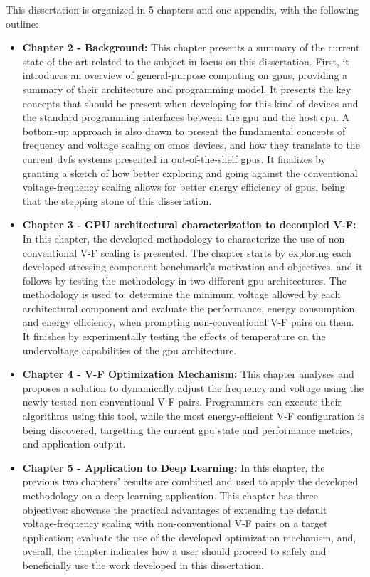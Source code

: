 This dissertation is organized in 5 chapters and one appendix, with the following outline:
\begin{itemize}
    \item \textbf{Chapter 2 - Background:} This chapter presents a summary of the current state-of-the-art related to the subject in focus on this dissertation. First, it introduces an overview of general-purpose computing on \acrshort{gpu}s, providing a summary of their architecture and programming model. It presents the key concepts that should be present when developing for this kind of devices and the standard programming interfaces between the \acrshort{gpu} and the host  \acrshort{cpu}. A bottom-up approach is also drawn to present the fundamental concepts of frequency and voltage scaling on \acrshort{cmos} devices, and how they translate to the current \acrshort{dvfs} systems presented in out-of-the-shelf \acrshort{gpu}s. It finalizes by granting a sketch of how better exploring and going against the conventional voltage-frequency scaling allows for better energy efficiency of \acrshort{gpu}s, being that the stepping stone of this dissertation. 
    \item \textbf{Chapter 3 - GPU architectural characterization to decoupled V-F:} In this chapter, the developed methodology to characterize the use of non-conventional V-F scaling is presented. The chapter starts by exploring each developed stressing component benchmark's motivation and objectives, and it follows by testing the methodology in two different \acrshort{gpu} architectures. The methodology is used to: determine the minimum voltage allowed by each architectural component and evaluate the performance, energy consumption and energy efficiency, when prompting non-conventional V-F pairs on them. It finishes by experimentally testing the effects of temperature on the undervoltage capabilities of the \acrshort{gpu} architecture.
    \item \textbf{Chapter 4 - V-F Optimization Mechanism:} This chapter analyses and proposes a solution to dynamically adjust the frequency and voltage using the newly tested non-conventional V-F pairs. Programmers can execute their algorithms using this tool, while the most energy-efficient V-F configuration is being discovered, targetting the current \acrshort{gpu} state and performance metrics, and application output.
    \item \textbf{Chapter 5 - Application to Deep Learning:} In this chapter, the previous two chapters' results are combined and used to apply the developed methodology on a deep learning application. This chapter has three objectives: showcase the practical advantages of extending the default voltage-frequency scaling with non-conventional V-F pairs on a target application; evaluate the use of the developed optimization mechanism, and, overall, the chapter indicates how a user should proceed to safely and beneficially use the work developed in this dissertation.

\end{itemize}
